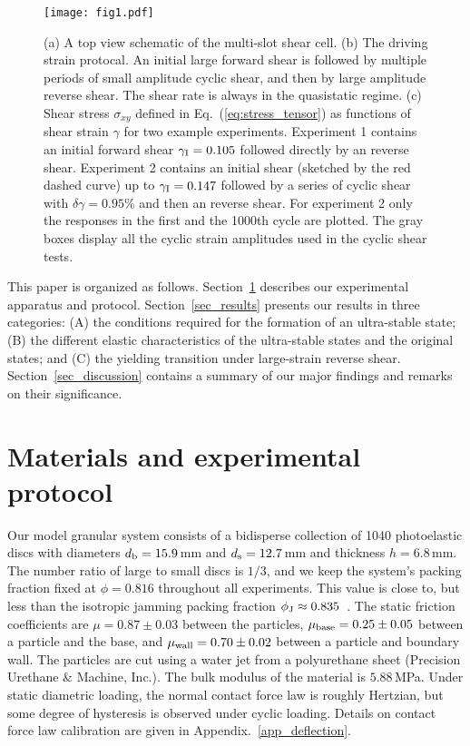\documentclass[twocolumn,showkeys,superscriptaddress,preprintnumbers,amsmath,amssymb,showpacs,prx,longbibliography]{revtex4-2}
\begin{document}
\begin{CJK*}{UTF8}{gbsn}
\begin{figure}[t]
    \centering
    \texttt{[image: fig1.pdf]}
    \caption{(a) A top view schematic of the multi-slot shear cell. (b) The driving strain protocal. An initial large forward shear is followed by multiple periods of small amplitude cyclic shear, and then by large amplitude reverse shear. The shear rate is always in the quasistatic regime. (c) Shear stress $\sigma_{xy}$ defined in Eq.~(\ref{eq:stress_tensor}) as functions of shear strain $\gamma$ for two example experiments. Experiment 1 contains an initial forward shear $\gamma_{\rm I} = 0.105$ followed directly by an reverse shear.  Experiment 2 contains an initial shear (sketched by the red dashed curve) up to $\gamma_{\rm I} = 0.147$ followed by a series of cyclic shear with $\delta\gamma = 0.95\%$ and then an reverse shear. For experiment 2 only the responses in the first and the 1000th cycle are plotted. The gray boxes display all the cyclic strain amplitudes used in the cyclic shear tests.}
    \label{fig:procedure}
\end{figure}

This paper is organized as follows.  Section~\ref{sec_methods} describes our experimental apparatus and protocol.  Section~\ref{sec_results} presents our results in three categories: (A) the conditions required for the formation of an ultra-stable state; (B) the different elastic characteristics of the ultra-stable states and the original states; and (C) the yielding transition under large-strain reverse shear. Section~\ref{sec_discussion} contains a summary of our major findings and remarks on their significance.



\section{Materials and experimental protocol}\label{sec_methods}



Our model granular system consists of a bidisperse collection of 1040 photoelastic discs with diameters $d_{\rm b}=15.9\,$mm and $d_{\rm s}=12.7\,$mm and thickness $h=6.8\,$mm. The number ratio of large to small discs is $1/3$, and we keep the system's packing fraction fixed at $\phi=0.816$ throughout all experiments. This value is close to, but less than the isotropic jamming packing fraction $\phi_{\rm J}\approx0.835$~\cite{Ren2013_prl}. The static friction coefficients are  $\mu = 0.87\pm 0.03$ between the particles, $\mu_{\rm base}=0.25\pm0.05$ between a particle and the base, and  $\mu_{\rm wall}= 0.70\pm 0.02$ between a particle and boundary wall. The particles are cut using a water jet from a polyurethane sheet (Precision Urethane \& Machine, Inc.). The bulk modulus of the material is $5.88\,$MPa. Under static diametric loading, the normal contact force law is roughly Hertzian, but some degree of hysteresis is observed under cyclic loading. Details on contact force law calibration are given in Appendix.~\ref{app_deflection}.


\end{CJK*}
\end{document}

